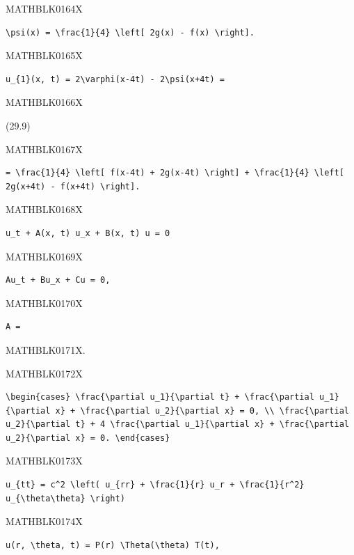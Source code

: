 \documentclass[
  ukrainian,
]{article}
\begin{document}
MATHBLK0164X

\begin{verbatim}
\psi(x) = \frac{1}{4} \left[ 2g(x) - f(x) \right].
\end{verbatim}

MATHBLK0165X

\begin{verbatim}
u_{1}(x, t) = 2\varphi(x-4t) - 2\psi(x+4t) =
\end{verbatim}

MATHBLK0166X

(29.9)

MATHBLK0167X

\begin{verbatim}
= \frac{1}{4} \left[ f(x-4t) + 2g(x-4t) \right] + \frac{1}{4} \left[ 2g(x+4t) - f(x+4t) \right].
\end{verbatim}

MATHBLK0168X

\begin{verbatim}
u_t + A(x, t) u_x + B(x, t) u = 0
\end{verbatim}

MATHBLK0169X

\begin{verbatim}
Au_t + Bu_x + Cu = 0,
\end{verbatim}

MATHBLK0170X

\begin{verbatim}
A =
\end{verbatim}

MATHBLK0171X.

MATHBLK0172X

\begin{verbatim}
\begin{cases} \frac{\partial u_1}{\partial t} + \frac{\partial u_1}{\partial x} + \frac{\partial u_2}{\partial x} = 0, \\ \frac{\partial u_2}{\partial t} + 4 \frac{\partial u_1}{\partial x} + \frac{\partial u_2}{\partial x} = 0. \end{cases}
\end{verbatim}

MATHBLK0173X

\begin{verbatim}
u_{tt} = c^2 \left( u_{rr} + \frac{1}{r} u_r + \frac{1}{r^2} u_{\theta\theta} \right)
\end{verbatim}

MATHBLK0174X

\begin{verbatim}
u(r, \theta, t) = P(r) \Theta(\theta) T(t),
\end{verbatim}
\end{document}
